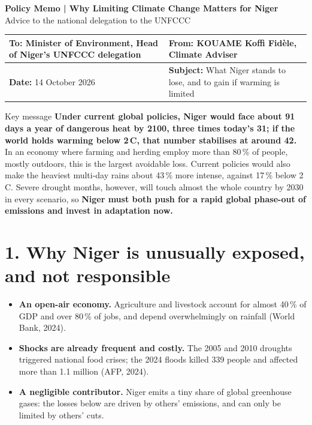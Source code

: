 \documentclass[10pt,a4paper]{article}
\newcommand{\degC}{\,\textdegree C}
\begin{document}
\begin{center}
{\LARGE\bfseries Policy Memo | Why Limiting Climate Change Matters for Niger}\\[2pt]
{\large Advice to the national delegation to the UNFCCC}
\end{center}
\vspace{-4pt}

{\small
\renewcommand{\arraystretch}{1.35}
\begin{tabularx}{\linewidth}{|>{\raggedright\arraybackslash}X|>{\raggedright\arraybackslash}X|}
\hline
\textbf{To:} Minister of Environment, Head of Niger's UNFCCC delegation &
\textbf{From:} KOUAME Koffi Fidèle, Climate Adviser \\
\hline
\textbf{Date:} 14 October 2026 &
\textbf{Subject:} What Niger stands to lose, and to gain if warming is limited \\
\hline
\end{tabularx}}

\vspace{4pt}
\begin{graybox}{Key message}
\textbf{Under current global policies, Niger would face about 91 days a year of dangerous heat by 2100, three
times today's 31; if the world holds warming below 2\degC, that number stabilises at around 42.} In an
economy where farming and herding employ more than 80\,\% of people, mostly outdoors, this is the largest
avoidable loss. Current policies would also make the heaviest multi-day rains about 43\,\% more intense,
against 17\,\% below 2\degC. Severe drought months, however, will touch almost the whole country by 2030 in
every scenario, so \textbf{Niger must both push for a rapid global phase-out of emissions and invest in
adaptation now.}
\end{graybox}

\section{1. Why Niger is unusually exposed, and not responsible}
\begin{itemize}
  \item \textbf{An open-air economy.} Agriculture and livestock account for almost 40\,\% of GDP and over
        80\,\% of jobs, and depend overwhelmingly on rainfall (World Bank, 2024).
  \item \textbf{Shocks are already frequent and costly.} The 2005 and 2010 droughts triggered national food
        crises; the 2024 floods killed 339 people and affected more than 1.1 million (AFP, 2024).
  \item \textbf{A negligible contributor.} Niger emits a tiny share of global greenhouse gases: the losses
        below are driven by others' emissions, and can only be limited by others' cuts.
\end{itemize}
\end{document}
